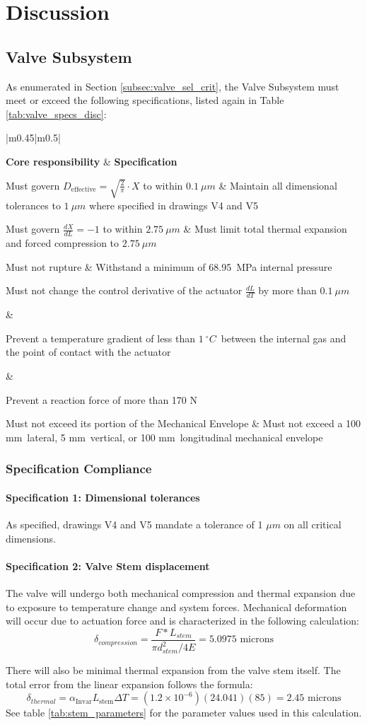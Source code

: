 \documentclass[12pt, letterpaper]{report}%
\newcounter{mycounter}           %
\newcounter{sub}[mycounter]      %
\newcommand{\degC}{^{\circ}C}    %
\newcommand{\specPressure}{68.95}%
\newcommand{\dDdXTol}{$0.1\ \mu m$}
\newcommand{\dXdLTol}{$2.75\ \mu m$}
\newcommand{\dLdTTolValve}{$0.1\ \mu m$}
\newcommand{\dTTol}{$1\ \degC$}
\newcommand{\FTolValve}{170 N}
\newcommand{\valveMEX}{100 mm}
\newcommand{\valveMEY}{5 mm}
\newcommand{\valveMEZ}{100 mm}
\newcommand{\valveSpecs}
{%
    \renewcommand{\arraystretch}{1.4}
    \begin{tabular}{|m{0.45\textwidth}|m{0.5\textwidth}|}

        \hline

            \textbf{Core responsibility}
                & 
            \textbf{Specification} \\ 
            
        \hline

        \vspace{0pt}
            Must govern
            $D_{\text{effective}} = \sqrt{\frac{2}{\pi}} \cdot X$
            to within \dDdXTol
                &
            Maintain all dimensional tolerances to $1\ \mu m$ where specified in drawings V4 and V5 \\
            
        \hline

        \vspace{0pt}
            Must govern
            $\frac{dX}{dL} = -1$
            to within \dXdLTol
                &
            Must limit total thermal expansion and forced compression to \dXdLTol \\
            
        \hline

            Must not rupture
                &
            Withstand a minimum of \specPressure\ MPa internal pressure \\
            
        \hline

            \multirow[c]{2}{0.45\textwidth}
                {%
                    Must not change the control derivative
                    of the actuator $\frac{dL}{dT}$
                    by more than \dLdTTolValve%
                }

                    &

            \rule{0pt}{1.5em}
                Prevent a temperature gradient of less than \dTTol\ between the internal gas and the point of contact with the actuator \\
            \cline{2-2}
        
                    &
        
            \rule{0pt}{2.5em}Prevent a reaction force of more than \FTolValve \\
            
        \hline

            Must not exceed its portion of the Mechanical Envelope
                &
            Must not exceed a \valveMEX\ lateral, \valveMEY\ vertical, or \valveMEZ\ longitudinal mechanical envelope \\

        \hline

    \end{tabular}
}
\begin{document}
\chapter{Discussion}
\label{sec:discussion}
    \section{Valve Subsystem}
            As enumerated in Section \ref{subsec:valve_sel_crit}, the Valve Subsystem must meet or exceed the following specifications, listed again in Table \ref{tab:valve_specs_disc}:

        \begin{table}[H]
            \centering
            \caption{Valve Specifications (repeated)}
            \valveSpecs
            \label{tab:valve_specs_disc}
        \end{table}
        \subsection{Specification Compliance}
        \subsubsection{Specification 1: Dimensional tolerances}
        \label{subsec:valve_spec_1}

            As specified, drawings V4 and V5 mandate a tolerance of 1 $\mu m$ on all critical dimensions.

        \subsubsection{Specification 2: Valve Stem displacement}
        \label{subsec:valve_spec_2}


                    The valve will undergo both mechanical compression and thermal expansion due to exposure to temperature change and system forces.
                    Mechanical deformation will occur due to actuation force and is characterized in the following calculation:
                \begin{equation}
                    \delta_{compression} = \frac{F *L_{stem}}{\pi d_{stem}^2/4 E} = 5.0975 \text{ microns}
                    \label{eq:stem_compression}
                \end{equation}


                There will also be minimal thermal expansion from the valve stem itself. The total error from the linear expansion follows the formula:
                \begin{equation}
                    \delta_{thermal} = \alpha_{\text{Invar}} L_{\text{stem}} \Delta T = (1.2 \times 10^{-6})(24.041)(85) = 2.45 \text{ microns}
                    \label{eq:stem_thermal_expansion}
                \end{equation}
                See table \ref{tab:stem_parameters} for the parameter values used in this calculation.
\end{document}
